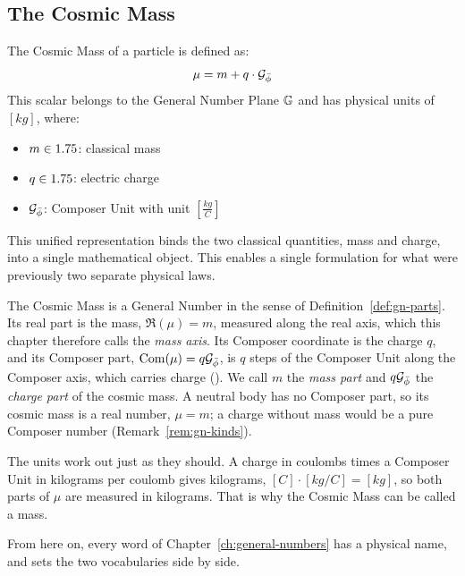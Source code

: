 \subsection{The Cosmic Mass}\label{subsec:cosmic-mass-def}

\begin{definition}\label{def:cosmic-mass}
The Cosmic Mass of a particle is defined as:
\[
\mu = m + q \cdot \mathcal{G}_{\bar{\phi}}
\]
This scalar belongs to the General Number Plane $\mathbb{G}$ and has physical units of $[kg]$, where:
\begin{itemize}
  \item $m \in 1.75$: classical mass
  \item $q \in 1.75$: electric charge
  \item $\mathcal{G}_{\bar{\phi}}$: Composer Unit with unit $\left[\frac{kg}{C}\right]$
\end{itemize}
\end{definition}

This unified representation binds the two classical quantities, mass and charge, into a single mathematical object. This enables a single formulation for what were previously two separate physical laws.

\begin{plainwords}
The Cosmic Mass is a General Number in the sense of Definition~\ref{def:gn-parts}. Its real part is the mass, $\Re(\mu) = m$, measured along the real axis, which this chapter therefore calls the \emph{mass axis}. Its Composer coordinate is the charge $q$, and its Composer part, $\operatorname{Com}(\mu) = q\mathcal{G}_{\bar{\phi}}$, is $q$ steps of the Composer Unit along the Composer axis, which carries charge (). We call $m$ the \emph{mass part} and $q\mathcal{G}_{\bar{\phi}}$ the \emph{charge part} of the cosmic mass. A neutral body has no Composer part, so its cosmic mass is a real number, $\mu = m$; a charge without mass would be a pure Composer number (Remark~\ref{rem:gn-kinds}).

The units work out just as they should. A charge in coulombs times a Composer Unit in kilograms per coulomb gives kilograms, $[C] \cdot [kg/C] = [kg]$, so both parts of $\mu$ are measured in kilograms. That is why the Cosmic Mass can be called a mass.
\end{plainwords}

From here on, every word of Chapter~\ref{ch:general-numbers} has a physical name, and  sets the two vocabularies side by side.

